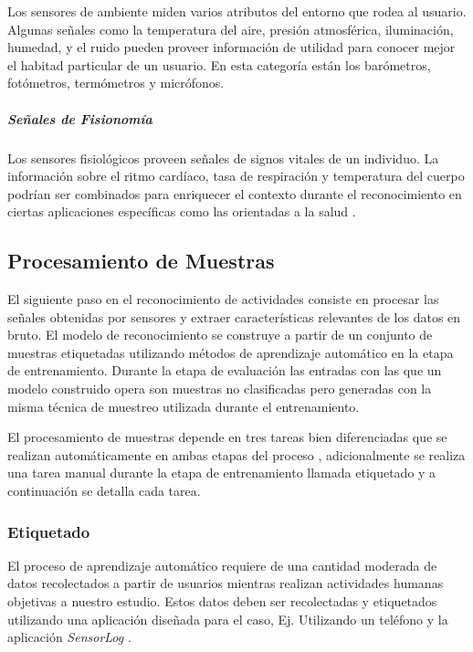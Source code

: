 Los sensores de ambiente miden varios atributos del entorno que rodea
al usuario. Algunas señales como la temperatura del aire, presión
atmosférica, iluminación, humedad, y el ruido pueden proveer información
de utilidad para conocer mejor el habitad particular de un usuario.
En esta categoría están los barómetros, fotómetros, termómetros y
micrófonos.

\subparagraph{Señales de Fisionomía}

Los sensores fisiológicos proveen señales de signos vitales de un
individuo. La información sobre el ritmo cardíaco, tasa de respiración
y temperatura del cuerpo podrían ser combinados para enriquecer el
contexto durante el reconocimiento en ciertas aplicaciones específicas
como las orientadas a la salud \cite{LaraLabrador2013}.

\subsection{Procesamiento de Muestras}

\label{sec44:proceso-se=0000F1ales}El siguiente paso en el reconocimiento
de actividades consiste en procesar las señales obtenidas por sensores
y extraer características relevantes de los datos en bruto. El modelo
de reconocimiento se construye a partir de un conjunto de muestras
etiquetadas utilizando métodos de aprendizaje automático en la etapa
de entrenamiento. Durante la etapa de evaluación las entradas con
las que un modelo construido opera son muestras no clasificadas pero
generadas con la misma técnica de muestreo utilizada durante el entrenamiento.

El procesamiento de muestras depende en tres tareas bien diferenciadas
que se realizan automáticamente en ambas etapas del proceso ,
adicionalmente se realiza una tarea manual durante la etapa de entrenamiento
llamada etiquetado y a continuación se detalla cada tarea.

\subsubsection{Etiquetado}

\label{ssec44:labeling}El proceso de aprendizaje automático requiere
de una cantidad moderada de datos recolectados a partir de usuarios
mientras realizan actividades humanas objetivas a nuestro estudio.
Estos datos deben ser recolectadas y etiquetados utilizando una aplicación
diseñada para el caso, Ej. Utilizando un teléfono 
y la aplicación \emph{SensorLog} \cite{Alan2014s}. 

